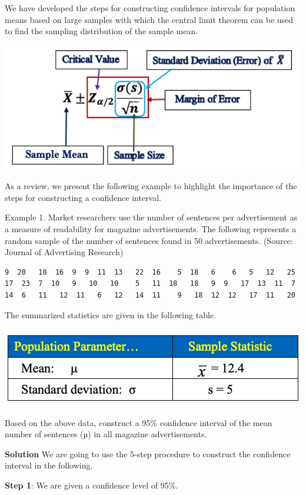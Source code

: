\documentclass[
]{book}
\begin{document}
We have developed the steps for constructing confidence intervals for population means based on large samples with which the central limit theorem can be used to find the sampling distribution of the sample mean.

\begin{center}\includegraphics[width=0.6\linewidth]{week07/ciFormulaReCap} \end{center}

As a review, we present the following example to highlight the importance of the steps for constructing a confidence interval.

Example 1. Market researchers use the number of sentences per advertisement as a measure of readability for magazine advertisements. The following represents a random sample of the number of sentences found in 50 advertisements. (Source: Journal of Advertising Research)

\begin{verbatim}
9  20   18  16  9  9  11  13   22  16    5  18   6    6   5   12   25
17  23  7  10   9   10   10    5   11  18   18   9  9   17  13  11  7
14  6   11   12  11   6   12   14  11    9   18  12  12   17  11   20
\end{verbatim}

The summarized statistics are given in the following table.

\begin{center}\includegraphics[width=0.6\linewidth]{week07/example01DataSummary} \end{center}

Based on the above data, construct a 95\% confidence interval of the mean number of sentences (µ) in all magazine advertisements.

\textbf{Solution} We are going to use the 5-step procedure to construct the confidence interval in the following.

\textbf{Step 1}: We are given a confidence level of 95\%.
\end{document}
